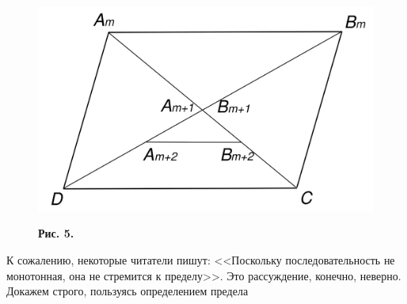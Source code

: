 \twocolumn
\begin{figure}[h]
    \centering
    \includegraphics[width=\linewidth]{piped.png}
    \begin{flushleft}
    \textbf{Рис. 5.}
    \end{flushleft}
\end{figure}
К сожалению, некоторые читатели пишут: <<Поскольку последовательность не монотонная, она не стремится к пределу>>. Это рассуждение, конечно, неверно. Докажем строго, пользуясь определением предела